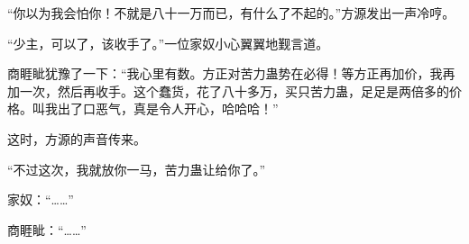 \begin{this_body}
“你以为我会怕你！不就是八十一万而已，有什么了不起的。”方源发出一声冷哼。

“少主，可以了，该收手了。”一位家奴小心翼翼地觐言道。

商睚眦犹豫了一下：“我心里有数。方正对苦力蛊势在必得！等方正再加价，我再加一次，然后再收手。这个蠢货，花了八十多万，买只苦力蛊，足足是两倍多的价格。叫我出了口恶气，真是令人开心，哈哈哈！”

这时，方源的声音传来。

“不过这次，我就放你一马，苦力蛊让给你了。”

家奴：“……”

商睚眦：“……”

\end{this_body}

